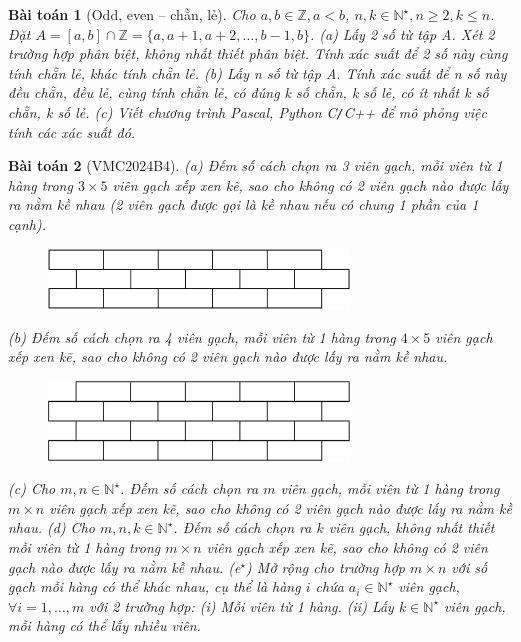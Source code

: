\documentclass{article}
\newtheorem{baitoan}{Bài toán}
\begin{document}
\begin{baitoan}[Odd, even -- chẵn, lẻ]
	Cho $a,b\in\mathbb{Z},a < b$, $n,k\in\mathbb{N}^\star,n\ge2,k\le n$. Đặt $A = [a,b]\cap\mathbb{Z} = \{a,a + 1,a + 2,\ldots,b - 1,b\}$. (a) Lấy 2 số từ tập A. Xét 2 trường hợp phân biệt, không nhất thiết phân biệt. Tính xác suất để 2 số này cùng tính chẵn lẻ, khác tính chẵn lẻ. (b) Lấy n số từ tập A. Tính xác suất để n số này đều chẵn, đều lẻ, cùng tính chẵn lẻ, có đúng k số chẵn, k số lẻ, có ít nhất k số chẵn, k số lẻ. (c) Viết chương trình {\sf Pascal, Python C{\tt/}C++} để mô phỏng việc tính các xác suất đó.
\end{baitoan}

\begin{baitoan}[VMC2024B4]
	(a) Đếm số cách chọn ra 3 viên gạch, mỗi viên từ 1 hàng trong $3\times5$ viên gạch xếp xen kẽ, sao cho không có 2 viên gạch nào được lấy ra nằm kề nhau (2 viên gạch được gọi là kề nhau nếu có chung 1 phần của 1 cạnh).
	\begin{figure}[H]
		\centering
		\includegraphics[width=8cm]{brick3x5}
	\end{figure}
	(b) Đếm số cách chọn ra 4 viên gạch, mỗi viên từ 1 hàng trong $4\times5$ viên gạch xếp xen kẽ, sao cho không có 2 viên gạch nào được lấy ra nằm kề nhau.
	\begin{figure}[H]
		\centering
		\includegraphics[width=8cm]{brick4x5}
	\end{figure}
	(c) Cho $m,n\in\mathbb{N}^\star$. Đếm số cách chọn ra $m$ viên gạch, mỗi viên từ 1 hàng trong $m\times n$ viên gạch xếp xen kẽ, sao cho không có 2 viên gạch nào được lấy ra nằm kề nhau. (d) Cho $m,n,k\in\mathbb{N}^\star$. Đếm số cách chọn ra $k$ viên gạch, không nhất thiết mỗi viên từ 1 hàng trong $m\times n$ viên gạch xếp xen kẽ, sao cho không có 2 viên gạch nào được lấy ra nằm kề nhau. (e${}^\star$) Mở rộng cho trường hợp $m\times n$ với số gạch mỗi hàng có thể khác nhau, cụ thể là hàng $i$ chứa $a_i\in\mathbb{N}^\star$ viên gạch, $\forall i = 1,\ldots,m$ với 2 trường hợp: (i) Mỗi viên từ 1 hàng. (ii) Lấy $k\in\mathbb{N}^\star$ viên gạch, mỗi hàng có thể lấy nhiều viên.
\end{baitoan}
\end{document}
